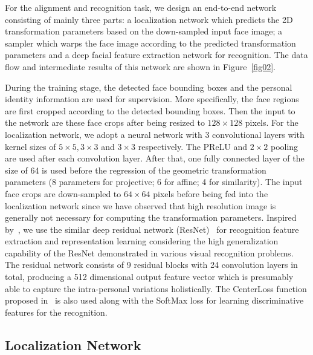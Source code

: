 \documentclass[10pt,twocolumn,letterpaper]{article}
\begin{document}
For the alignment and recognition task, we design an end-to-end network consisting of mainly three parts: a localization network which predicts the 2D transformation parameters based on the down-sampled input face image; a sampler which warps the face image according to the predicted transformation parameters and a deep facial feature extraction network for recognition. The data flow and intermediate results of this network are shown in Figure~\ref{fig02}. 

During the training stage, the detected face bounding boxes and the personal identity information are used for supervision.
More specifically, the face regions are first cropped according to the detected bounding boxes.
Then the input to the network are these face crops after being resized to $128\times 128$ pixels.
For the localization network, we adopt a neural network with 3 convolutional layers with kernel sizes of $5\times5,3\times3$ and $3\times3$ respectively. The PReLU and $2\times2$ pooling are used after each convolution layer.
After that, one fully connected layer of the size of 64 is used before the regression of the geometric transformation parameters (8 parameters for projective; 6 for affine; 4 for similarity).
The input face crops are down-sampled to $64\times64$ pixels before being fed into the localization network since we have observed that high resolution image is generally not necessary for computing the transformation parameters. 
Inspired by~\cite{wen2016discriminative}, we use the similar deep residual network (ResNet)~\cite{he2015deep} for recognition feature extraction and representation learning considering the high generalization capability of the ResNet demonstrated in various visual recognition problems. 
The residual network consists of 9 residual blocks with 24 convolution layers in total, producing a 512 dimensional output feature vector which is presumably able to capture the intra-personal variations holistically. 
The CenterLoss function proposed in~\cite{wen2016discriminative} is also used along with the SoftMax loss for learning discriminative features for the recognition.


\subsection{Localization Network}
\end{document}
